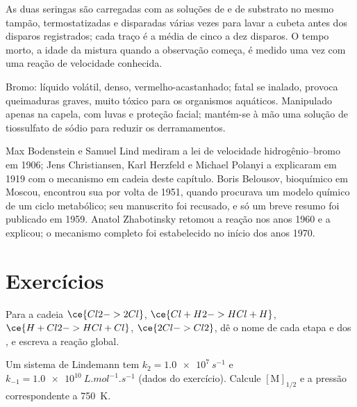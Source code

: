 \begin{inthelab}
As duas seringas são carregadas com as soluções de  e de substrato no mesmo
tampão, termostatizadas e disparadas várias vezes para lavar a cubeta antes dos
disparos registrados; cada traço é a média de cinco a dez disparos. O tempo morto,
a idade da mistura quando a observação começa, é medido uma vez com uma reação de
velocidade conhecida.
\end{inthelab}

\begin{safety}{}
Bromo: líquido volátil, denso, vermelho-acastanhado; fatal se inalado, provoca
queimaduras graves, muito tóxico para os organismos aquáticos. Manipulado apenas na
capela, com luvas e proteção facial; mantém-se à mão uma solução de tiossulfato de
sódio para reduzir os derramamentos.
\end{safety}

\begin{history}
Max Bodenstein e Samuel Lind mediram a lei de velocidade hidrogênio--bromo em
1906; Jens Christiansen, Karl Herzfeld e Michael Polanyi a explicaram em 1919 com o
mecanismo em cadeia deste capítulo. Boris Belousov, bioquímico em Moscou,
encontrou sua  por volta de 1951, quando procurava um modelo
químico de um ciclo metabólico; seu manuscrito foi recusado, e só um breve resumo
foi publicado em 1959. Anatol Zhabotinsky retomou a reação nos anos 1960 e a
explicou; o mecanismo completo foi estabelecido no início dos anos 1970.
\end{history}

\section{Exercícios}

\begin{exercise}[$\star$]\label{exo:b3:complex-kinetics:1}
Para a cadeia $\ce{Cl2 -> 2 Cl}$, $\ce{Cl + H2 -> HCl + H}$, $\ce{H + Cl2 -> HCl + Cl}$, $\ce{2 Cl -> Cl2}$,
dê o nome de cada etapa e dos , e escreva a reação global.
\end{exercise}

\begin{exercise}[$\star$]\label{exo:b3:complex-kinetics:2}
Um sistema de Lindemann tem $k_2 = \qty{1.0e7}{s^{-1}}$ e $k_{-1} = \qty{1.0e10}{L.mol^{-1}.s^{-1}}$ (dados do
exercício). Calcule $[\mathrm M]_{1/2}$ e a pressão correspondente a \qty{750}{K}.
\end{exercise}

